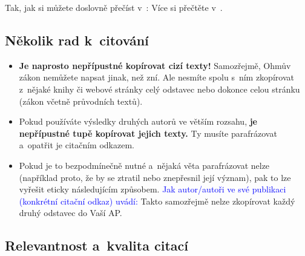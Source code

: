 Tak, jak si můžete doslovně přečíst v~\cite{AbsolventThesis:FRANCIREK_AP}\?:  Více si přečtěte v~\cite[kapitola~2.3.4]{AbsolventThesis:FRANCIREK_AP}.


\subsection{Několik rad k~citování}

\begin{itemize}
    \item \textbf{Je naprosto nepřípustné kopírovat cizí texty!} Samozřejmě, Ohmův zákon ne\-mů\-že\-te napsat jinak, než zní. Ale nesmíte spolu s~ním zkopírovat z~nějaké knihy či webové stránky celý odstavec nebo dokonce celou stránku (zákon včetně průvodních textů).
    \item Pokud používáte výsledky druhých autorů ve větším rozsahu, \textbf{je nepřípustné tupě kopírovat jejich texty.} Ty musíte parafrázovat a~opatřit je citačním odkazem. 
    \item Pokud je to bezpodmínečně nutné a~nějaká věta parafrázovat nelze (například proto, že by se ztratil nebo znepřesnil její význam), pak to lze vyřešit eticky následujícím způsobem. \textcolor{blue}{Jak autor/autoři ve své publikaci (konkrétní citační odkaz) uvádí\?: } Takto samozřejmě nelze zkopírovat každý druhý odstavec do Vaší AP.
\end{itemize}


\subsection{Relevantnost a~kvalita citací}


